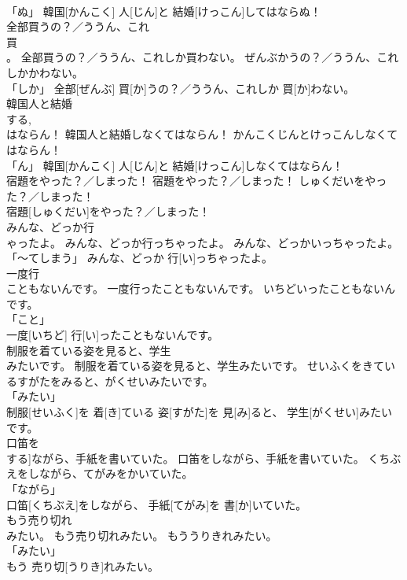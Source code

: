 \documentclass[8pt]{extreport}
\begin{document}
\begin{CJK}{UTF8}{min}
\\	「ぬ」	韓国[かんこく] 人[じん]と 結婚[けっこん]してはならぬ！		
\\	全部買うの？／ううん、これ
\\	買
\\	。	全部買うの？／ううん、これしか買わない。	ぜんぶかうの？／ううん、これしかかわない。	
\\	「しか」	全部[ぜんぶ] 買[か]うの？／ううん、これしか 買[か]わない。		
\\	韓国人と結婚
\\	する, 
\\	はならん！	韓国人と結婚しなくてはならん！	かんこくじんとけっこんしなくてはならん！	
\\	「ん」	韓国[かんこく] 人[じん]と 結婚[けっこん]しなくてはならん！		
\\	宿題をやった？／しまった！	宿題をやった？／しまった！	しゅくだいをやった？／しまった！	
\\	宿題[しゅくだい]をやった？／しまった！		
\\	みんな、どっか行
\\	ゃったよ。	みんな、どっか行っちゃったよ。	みんな、どっかいっちゃったよ。	
\\	「～てしまう」	みんな、どっか 行[い]っちゃったよ。		
\\	一度行
\\	こともないんです。	一度行ったこともないんです。	いちどいったこともないんです。	
\\	「こと」 
\\	一度[いちど] 行[い]ったこともないんです。		
\\	制服を着ている姿を見ると、学生
\\	みたいです。	制服を着ている姿を見ると、学生みたいです。	せいふくをきているすがたをみると、がくせいみたいです。	
\\	「みたい」 
\\	制服[せいふく]を 着[き]ている 姿[すがた]を 見[み]ると、 学生[がくせい]みたいです。		
\\	口笛を
\\	する]ながら、手紙を書いていた。	口笛をしながら、手紙を書いていた。	くちぶえをしながら、てがみをかいていた。	
\\	「ながら」 
\\	口笛[くちぶえ]をしながら、 手紙[てがみ]を 書[か]いていた。		
\\	もう売り切れ
\\	みたい。	もう売り切れみたい。	もううりきれみたい。	
\\	「みたい」 
\\	もう 売り切[うりき]れみたい。		

\end{CJK}
\end{document}
